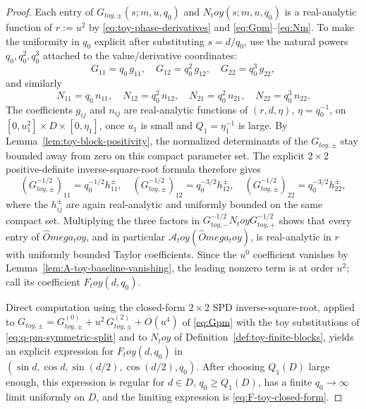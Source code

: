 \documentclass[11pt,a4paper]{amsart}
\def\Omega{Omega}%
\def\toy{toy}%
\numberwithin{equation}{section}
\theoremstyle{plain}
\theoremstyle{definition}
\newcommand{\Om}{\Omega}
\newcommand{\toy}{\mathrm{toy}}
\begin{document}
\begin{proof}
Each entry of \(G_{\toy,\pm}(s;m,u,q_0)\) and \(N_\toy(s;m,u,q_0)\) is a
real-analytic function of \(r:=u^2\) by \eqref{eq:toy-phase-derivatives}
and \eqref{eq:Gpm}--\eqref{eq:Nm}.  To make the uniformity in \(q_0\)
explicit after substituting \(s=d/q_0\), use the natural powers
\(q_0,q_0^2,q_0^3\) attached to the value/derivative coordinates:
\[
G_{11}=q_0\,g_{11},\quad G_{12}=q_0^2\,g_{12},\quad
G_{22}=q_0^3\,g_{22},
\]
and similarly
\[
N_{11}=q_0\,n_{11},\quad N_{12}=q_0^2\,n_{12},\quad
N_{21}=q_0^2\,n_{21},\quad N_{22}=q_0^3\,n_{22}.
\]
The coefficients \(g_{ij}\) and \(n_{ij}\) are real-analytic functions
of \((r,d,\eta)\), \(\eta=q_0^{-1}\), on
\([0,u_1^2]\times D\times[0,\eta_1]\), once \(u_1\) is small and
\(Q_1=\eta_1^{-1}\) is large.  By Lemma~\ref{lem:toy-block-positivity},
the normalized determinants of the \(G_{\toy,\pm}\) stay bounded away
from zero on this compact parameter set.  The explicit \(2\times2\)
positive-definite inverse-square-root formula therefore gives
\[
(G_{\toy,\pm}^{-1/2})_{11}=q_0^{-1/2}h_{11}^{\pm},\quad
(G_{\toy,\pm}^{-1/2})_{12}=q_0^{-3/2}h_{12}^{\pm},\quad
(G_{\toy,\pm}^{-1/2})_{22}=q_0^{-3/2}h_{22}^{\pm},
\]
where the \(h_{ij}^{\pm}\) are again real-analytic and uniformly bounded
on the same compact set.  Multiplying the three factors in
\(G_{\toy,-}^{-1/2}N_\toy G_{\toy,+}^{-1/2}\) shows that every entry of
\(\widehat\Om_\toy\), and in particular
\(\mathcal A_\toy(\widehat\Om_\toy)\), is real-analytic in \(r\) with
uniformly bounded Taylor coefficients.  Since the \(u^0\) coefficient
vanishes by Lemma~\ref{lem:A-toy-baseline-vanishing}, the leading
nonzero term is at order \(u^2\); call its coefficient
\(F_\toy(d,q_0)\).

Direct computation using the closed-form \(2\times 2\) SPD
inverse-square-root, applied to
\(G_{\toy,\pm}=G_{\toy,\pm}^{(0)}+u^2\,G_{\toy,\pm}^{(2)}+O(u^4)\) of
\eqref{eq:Gpm} with the toy substitutions of
\eqref{eq:q-pm-symmetric-split} and to \(N_\toy\) of
Definition~\ref{def:toy-finite-blocks}, yields an explicit expression
for \(F_\toy(d,q_0)\) in
\((\sin d,\cos d,\sin(d/2),\cos(d/2),q_0)\).  After choosing
\(Q_1(D)\) large enough, this expression is regular for
\(d\in D\), \(q_0\ge Q_1(D)\), has a finite \(q_0\to\infty\) limit
uniformly on \(D\), and the limiting expression is
\eqref{eq:F-toy-closed-form}.


\end{proof}
\end{document}
